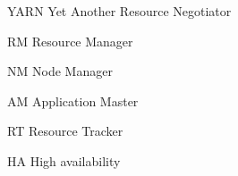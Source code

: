 \begin{basedescript}{\desclabelstyle{\pushlabel}\desclabelwidth{10em}}
\item[YARN] Yet Another Resource Negotiator
  \cite{Vavilapalli:2013:AHY:2523616.2523633}
\item[RM] Resource Manager
\item[NM] Node Manager
\item[AM] Application Master
\item[RT] Resource Tracker
\item[HA] High availability
\end{basedescript}